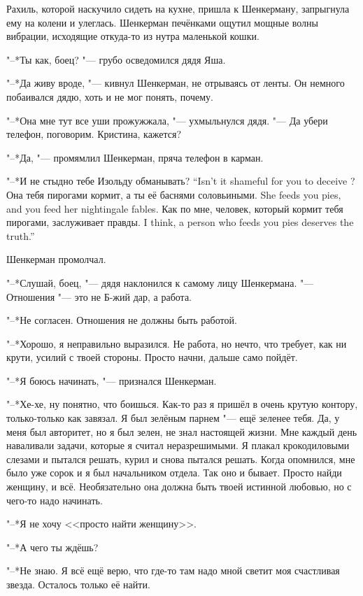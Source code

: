 Рахиль, которой наскучило сидеть на кухне, пришла к Шенкерману, запрыгнула ему на колени и улеглась.
Шенкерман печёнками ощутил мощные волны вибрации, исходящие откуда-то из нутра маленькой кошки.

"--*Ты как, боец? "--- грубо осведомился дядя Яша.

"--*Да живу вроде, "--- кивнул Шенкерман, не отрываясь от ленты.
Он немного побаивался дядю, хоть и не мог понять, почему.

"--*Она мне тут все уши прожужжала, "--- ухмыльнулся дядя.
"--- Да убери телефон, поговорим.
Кристина, кажется?

"--*Да, "--- промямлил Шенкерман, пряча телефон в карман.

{"--*И не стыдно тебе Изольду обманывать?}
{``Isn't it shameful for you to deceive \Izolda?}
{Она тебя пирогами кормит, а ты её баснями соловьиными.}
{She feeds you pies, and you feed her nightingale fables.}
{Как по мне, человек, который кормит тебя пирогами, заслуживает правды.}
{I think, a person who feeds you pies deserves the truth.''}

Шенкерман промолчал.

"--*Слушай, боец, "--- дядя наклонился к самому лицу Шенкермана.
"--- Отношения "--- это не Б-жий дар, а работа.

"--*Не согласен.
Отношения не должны быть работой.

"--*Хорошо, я неправильно выразился.
Не работа, но нечто, что требует, как ни крути, усилий с твоей стороны.
Просто начни, дальше само пойдёт.

"--*Я боюсь начинать, "--- признался Шенкерман.

"--*Хе-хе, ну понятно, что боишься.
Как-то раз я пришёл в очень крутую контору, только-только как завязал.
Я был зелёным парнем "--- ещё зеленее тебя.
Да, у меня был авторитет, но я был зелен, не знал настоящей жизни.
Мне каждый день наваливали задачи, которые я считал неразрешимыми.
Я плакал крокодиловыми слезами и пытался решать, курил и снова пытался решать.
Когда опомнился, мне было уже сорок и я был начальником отдела.
Так оно и бывает.
Просто найди женщину, и всё.
Необязательно она должна быть твоей истинной любовью, но с чего-то надо начинать.

"--*Я не хочу <<просто найти женщину>>.

"--*А чего ты ждёшь?

"--*Не знаю.
Я всё ещё верю, что где-то там надо мной светит моя счастливая звезда.
Осталось только её найти.


